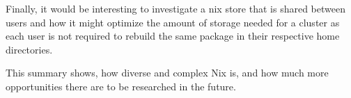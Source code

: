 \documentclass{eceasst}
\begin{document}
Finally, it would be interesting to investigate a nix store that is shared between users and how it might optimize the amount of storage needed for a cluster as each user is not required to rebuild the same package in their respective home directories.

This summary shows, how diverse and complex Nix is, and how much more opportunities there are to be researched in the future.



\nocite{*}


\end{document}

